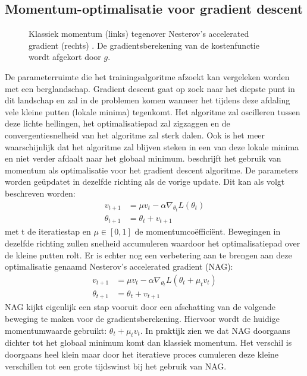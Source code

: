 \subsection{Momentum-optimalisatie voor gradient descent}
\begin{figure}[!t]
	\centering
	\def\svgwidth{0.6\columnwidth}
	
	\caption{Klassiek momentum (links) tegenover Nesterov's accelerated gradient (rechts) \cite{sutskever2013importance}. De gradientsberekening van de kostenfunctie wordt afgekort door $g$.}
	\label{fig:momentum}
\end{figure}
De parameterruimte die het trainingsalgoritme afzoekt kan vergeleken worden met een berglandschap. Gradient descent gaat op zoek naar het diepste punt in dit landschap en zal in de problemen komen wanneer het tijdens deze afdaling vele kleine putten (lokale minima) tegenkomt. Het algoritme zal oscilleren tussen deze lichte hellingen, het optimalisatiepad zal zigzaggen en de convergentiesnelheid van het algoritme zal sterk dalen. Ook is het meer waarschijnlijk dat het algoritme zal blijven steken in een van deze lokale minima en niet verder afdaalt naar het globaal minimum.
\npar \cite{botev_nesterovs_2016} beschrijft het gebruik van momentum als optimalisatie voor het gradient descent algoritme. De parameters worden ge\"updatet in dezelfde richting als de vorige update. Dit kan als volgt beschreven worden:
\begin{equation}
\begin{aligned}
v_{t+1} &= \mu v_{t} - \alpha\nabla_{\theta_t} L(\theta_{t})\\
\theta_{t+1} &= \theta_t + v_{t+1}
\end{aligned}
\end{equation}
met t de iteratiestap en $\mu \in[0,1]$ de momentumco\"effici\"ent. Bewegingen in dezelfde richting zullen snelheid accumuleren waardoor het optimalisatiepad over de kleine putten rolt. Er is echter nog een verbetering aan te brengen aan deze optimalisatie genaamd Nesterov's accelerated gradient (NAG):
\begin{equation}
\begin{aligned}
v_{t+1} &= \mu v_t - \alpha\nabla_{\theta_t} L(\theta_{t}+\mu_tv_t)\\
\theta_{t+1} &= \theta_t + v_{t+1}
\end{aligned}
\end{equation}
\npar NAG kijkt eigenlijk een stap vooruit door een afschatting van de volgende beweging te maken voor de gradientsberekening. Hiervoor wordt de huidige momentumwaarde gebruikt: $\theta_{t}+\mu_tv_t$.  In praktijk zien we dat NAG doorgaans dichter tot het globaal minimum komt dan klassiek momentum. Het verschil is doorgaans heel klein maar door het iteratieve proces cumuleren deze kleine verschillen tot een grote tijdswinst bij het gebruik van NAG.

